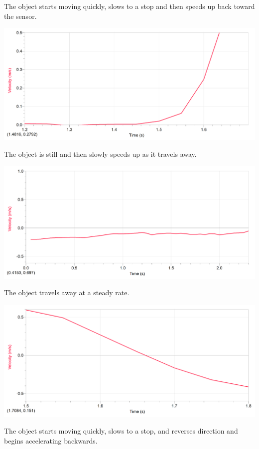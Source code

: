 \begin{center}
        The object starts moving quickly, slows to a stop and then speeds up back toward the sensor.

        \includegraphics[width=\textwidth]{image7.png}
        
        The object is still and then slowly speeds up as it travels away.

        \includegraphics[width=\textwidth]{image18.png}
        
        The object travels away at a steady rate.

        \includegraphics[width=\textwidth]{image4.png}
        
        The object starts moving quickly, slows to a stop, and reverses direction and begins accelerating backwards.
    \end{center}

